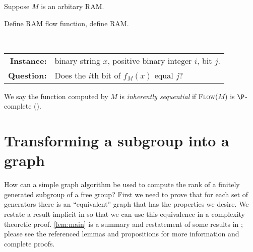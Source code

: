 \documentclass{article}
\begin{document}
Suppose $M$ is an arbitary RAM.

\begin{todo}
  Define RAM flow function, define RAM.
\end{todo}

\begin{definition}
  \mbox{} \\
  \begin{tabular}{r p{9.5cm}}
    \textbf{Instance:} & binary string $x$, positive binary integer $i$, bit $j$. \\
    \textbf{Question:} & Does the $i$th bit of $f_M(x)$ equal $j$?
  \end{tabular}
\end{definition}

We say the function computed by $M$ is \emph{inherently sequential} if \textsc{Flow($M$)} is $\P$-complete (\autocite[Definition~8.2.2]{ghr95}).

\section{Transforming a subgroup into a graph}

How can a simple graph algorithm be used to compute the rank of a finitely generated subgroup of a free group?
First we need to prove that for each set of generators there is an ``equivalent'' graph that has the properties we desire.
We restate a result implicit in \autocite{km02} so that we can use this equivalence in a complexity theoretic proof.
\autoref{lem:main} is a summary and restatement of some results in \autocite{km02}; please see the referenced lemmas and propositions for more information and complete proofs.
\end{document}
